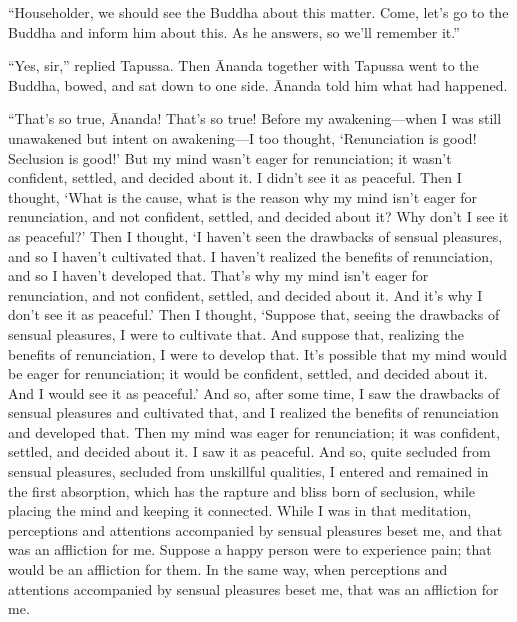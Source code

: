 \documentclass[12pt,openany]{book}%
\begin{document}
“Householder, we should see the Buddha about this matter. Come, let’s go to the Buddha and inform him about this. As he answers, so we’ll remember it.” 

“Yes, sir,” replied Tapussa. Then Ānanda together with Tapussa went to the Buddha, bowed, and sat down to one side. Ānanda told him what had happened. 

“That’s so true, Ānanda! That’s so true! Before my awakening—when I was still unawakened but intent on awakening—I too thought, ‘Renunciation is good! Seclusion is good!’ But my mind wasn’t eager for renunciation; it wasn’t confident, settled, and decided about it. I didn’t see it as peaceful. Then I thought, ‘What is the cause, what is the reason why my mind isn’t eager for renunciation, and not confident, settled, and decided about it? Why don’t I see it as peaceful?’ Then I thought, ‘I haven’t seen the drawbacks of sensual pleasures, and so I haven’t cultivated that. I haven’t realized the benefits of renunciation, and so I haven’t developed that. That’s why my mind isn’t eager for renunciation, and not confident, settled, and decided about it. And it’s why I don’t see it as peaceful.’ Then I thought, ‘Suppose that, seeing the drawbacks of sensual pleasures, I were to cultivate that. And suppose that, realizing the benefits of renunciation, I were to develop that. It’s possible that my mind would be eager for renunciation; it would be confident, settled, and decided about it. And I would see it as peaceful.’ And so, after some time, I saw the drawbacks of sensual pleasures and cultivated that, and I realized the benefits of renunciation and developed that. Then my mind was eager for renunciation; it was confident, settled, and decided about it. I saw it as peaceful. And so, quite secluded from sensual pleasures, secluded from unskillful qualities, I entered and remained in the first absorption, which has the rapture and bliss born of seclusion, while placing the mind and keeping it connected. While I was in that meditation, perceptions and attentions accompanied by sensual pleasures beset me, and that was an affliction for me. Suppose a happy person were to experience pain; that would be an affliction for them. In the same way, when perceptions and attentions accompanied by sensual pleasures beset me, that was an affliction for me. 
\end{document}
